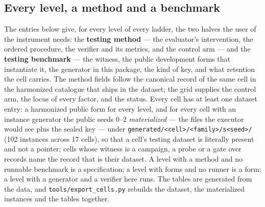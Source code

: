 \subsection{Every level, a method and a benchmark}\label{sec:methods}
The entries below give, for every level of every ladder, the two halves the user of the instrument needs: the \textbf{testing method} --- the evaluator's intervention, the ordered procedure, the verifier and its metrics, and the control arm --- and the \textbf{testing benchmark} --- the witness, the public development forms that instantiate it, the generator in this package, the kind of key, and what retention the cell carries. The method fields follow the canonical record of the same cell in the harmonized catalogue that ships in the dataset; the grid supplies the control arm, the locus of every factor, and the status. Every cell has at least one dataset entry: a harmonized public form for every level, and for every cell with an instance generator the public seeds 0--2 \emph{materialized} --- the files the executor would see plus the sealed key --- under \texttt{generated/<cell>/<family>/s<seed>/} (102 instances across 17 cells), so that a cell's testing dataset is literally present and not a pointer; cells whose witness is a campaign, a probe or a gate over records name the record that is their dataset. A level with a method and no runnable benchmark is a specification; a level with forms and no runner is a form; a level with a generator and a verifier here runs. The tables are generated from the data, and \texttt{tools/export\_cells.py} rebuilds the dataset, the materialized instances and the tables together.



